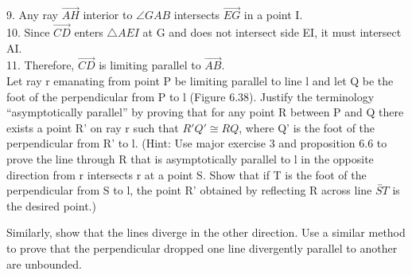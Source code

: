 \documentclass[12pt,letterpaper]{article}
\newcommand{\prob}[1]{\newpage\noindent {\bf #1}}
\begin{document}
9. Any ray $\overrightarrow{AH}$ interior to $\angle GAB$ intersects $\overrightarrow{EG}$ in a point I.\\

10.  Since $\overrightarrow{CD}$ enters $\triangle AEI$ at G and does not intersect side EI, it must intersect AI.\\

11. Therefore, $\overrightarrow{CD}$ is limiting parallel to $\overrightarrow{AB}$. \\




\prob{Major Exercises 11 } Let ray r emanating from point P be limiting parallel to line l and let Q be the foot of the perpendicular from P to l (Figure 6.38).  Justify the terminology ``asymptotically parallel'' by proving that for any point R between P and Q there exists a point R' on ray r such that $R'Q' \cong RQ$, where Q' is the foot of the perpendicular from R' to l.  (Hint: Use major exercise 3 and proposition 6.6 to prove the line through R that is asymptotically parallel to l in the opposite direction from r intersects r at a point S.  Show that if T is the foot of the perpendicular from S to l, the point R' obtained by reflecting R across line $\overleftrightarrow{ST}$ is the desired point.)

	Similarly, show that the lines diverge in the other direction.  Use a similar method to prove that the perpendicular dropped one line divergently parallel to another are unbounded. 
\end{document}
